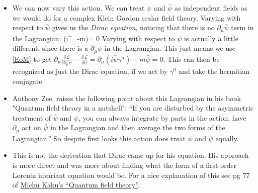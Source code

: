 \documentclass[11pt]{article}
\renewenvironment{flalign}{\vspace{-3mm}\empheq[box=\tcbhighmath]{align}}{\endempheq}
\numberwithin{equation}{section}
\begin{document}
\begin{itemize}
  \item We can now vary this action. We can treat $\psi$ and $\bar{\psi}$ as independent fields as we would do for a complex Klein Gordon scalar field theory. Varying with respect to $\bar{\psi}$ gives us the \emph{Dirac equation}, noticing that there is no $\partial_{\mu}\bar{\psi}$ term in the Lagrangian:
  \begin{flalign}
  \label{Dirac}
      (i\gamma^{\mu}\partial_{\mu}-m)\psi = 0
    \end{flalign} 
    Varying with respect to $\psi$ is actually a little different, since there is a $\partial_{\mu}\psi$ in the Lagrangian. This just means we use \ref{EoM} to get $\partial_{\mu}\frac{\delta \mathcal{L}}{\delta \partial_{\mu} \psi}-\frac{\delta \mathcal{L}}{\delta \psi}  = \partial_{\mu}(i\bar{\psi}\gamma^{\mu})+m\bar{\psi}=0$. This can then be recognized as just the Dirac equation, if we act by $\gamma^{0}$ and take the hermitian conjugate. 

\item Anthony Zee, raises the following point about this Lagrangian in his book "Quantum field theory in a nutshell": ``If you are disturbed by the asymmetric treatment of $\bar{\psi}$ and $\psi$, you can always integrate by parts in the action, have $\partial_{\mu}$  act on $\bar{\psi}$ in the Lagrangian and then average the two forms of the Lagrangian.'' So despite first looks this action does treat $\psi$ and $\bar{\psi}$ equally. 

\item This is not the derivation that Dirac came up for his equation. His approach is more direct and was more about finding what the form of a first order Lorentz invariant equation would be. For a nice explanation of this see pg 77 of  \href{https://archive.org/details/quantumfieldtheo0000kaku}{Michu Kaku's ``Quantum field theory''}. 


\end{itemize}
\end{document}
